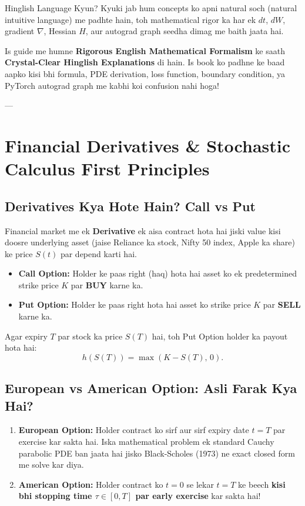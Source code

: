 \documentclass[11pt,a4paper,oneside]{book}
\begin{document}
\begin{intuitionbox}{Hinglish Language Kyun?}
Kyuki jab hum concepts ko apni natural soch (natural intuitive language) me padhte hain, toh mathematical rigor ka har ek $dt$, $dW$, gradient $\nabla$, Hessian $H$, aur autograd graph seedha dimag me baith jaata hai. 

Is guide me humne \textbf{Rigorous English Mathematical Formalism} ke saath \textbf{Crystal-Clear Hinglish Explanations} di hain. Is book ko padhne ke baad aapko kisi bhi formula, PDE derivation, loss function, boundary condition, ya PyTorch autograd graph me kabhi koi confusion nahi hoga!
\end{intuitionbox}

---

\chapter{Financial Derivatives \& Stochastic Calculus First Principles}

\section{Derivatives Kya Hote Hain? Call vs Put}
Financial market me ek \textbf{Derivative} ek aisa contract hota hai jiski value kisi doosre underlying asset (jaise Reliance ka stock, Nifty 50 index, Apple ka share) ke price $S(t)$ par depend karti hai.

\begin{itemize}[leftmargin=1.5em]
    \item \textbf{Call Option:} Holder ke paas right (haq) hota hai asset ko ek predetermined strike price $K$ par \textbf{BUY} karne ka.
    \item \textbf{Put Option:} Holder ke paas right hota hai asset ko strike price $K$ par \textbf{SELL} karne ka.
\end{itemize}

Agar expiry $T$ par stock ka price $S(T)$ hai, toh Put Option holder ka payout hota hai:
\begin{equation}
    h(S(T)) = \max(K - S(T), \, 0).
\end{equation}

\section{European vs American Option: Asli Farak Kya Hai?}
\begin{enumerate}[leftmargin=1.5em]
    \item \textbf{European Option:} Holder contract ko sirf aur sirf expiry date $t = T$ par exercise kar sakta hai. Iska mathematical problem ek standard Cauchy parabolic PDE ban jaata hai jisko Black-Scholes (1973) ne exact closed form me solve kar diya.
    \item \textbf{American Option:} Holder contract ko $t=0$ se lekar $t=T$ ke beech \textbf{kisi bhi stopping time $\tau \in [0, T]$ par early exercise} kar sakta hai!
\end{enumerate}
\end{document}
